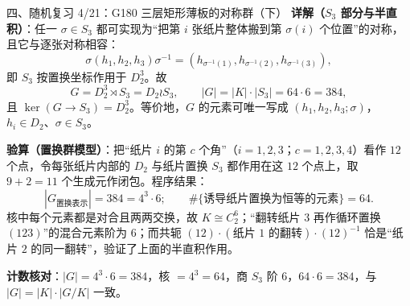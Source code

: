\documentclass[aspectratio=169,10pt,fontset=none]{ctexbeamer}
\newcommand{\key}[1]{\textcolor{ink}{\bfseries #1}}
\begin{document}
\begin{frame}[t]{四、随机复习 4/21：G180 三层矩形薄板的对称群（下）}
\scriptsize
\key{详解（$S_3$ 部分与半直积）}：任一 $\sigma\in S_3$ 都可实现为“把第 $i$ 张纸片整体搬到第 $\sigma(i)$ 个位置”的对称，且它与逐张对称相容：
\[ \sigma(h_1,h_2,h_3)\sigma^{-1}=(h_{\sigma^{-1}(1)},h_{\sigma^{-1}(2)},h_{\sigma^{-1}(3)}), \]
即 $S_3$ 按置换坐标作用于 $D_2^3$。故
\[ G=D_2^3\rtimes S_3=D_2\wr S_3,\qquad |G|=|K|\cdot|S_3|=64\cdot6=384, \]
且 $\ker(G\to S_3)=D_2^3$。等价地，$G$ 的元素可唯一写成 $(h_1,h_2,h_3;\sigma)$，$h_i\in D_2$、$\sigma\in S_3$。

\key{验算（置换群模型）}：把“纸片 $i$ 的第 $c$ 个角”（$i=1,2,3$；$c=1,2,3,4$）看作 $12$ 个点，令每张纸片内部的 $D_2$ 与纸片置换 $S_3$ 都作用在这 $12$ 个点上，取 $9+2=11$ 个生成元作闭包。程序结果：
\[ |G_{\text{置换表示}}|=384=4^3\cdot6;\qquad \#\{\text{诱导纸片置换为恒等的元素}\}=64. \]
核中每个元素都是对合且两两交换，故 $K\cong C_2^6$；“翻转纸片 $3$ 再作循环置换 $(123)$”的混合元素阶为 $6$；而共轭 $(12)\cdot(\text{纸片 }1\text{ 的翻转})\cdot(12)^{-1}$ 恰是“纸片 $2$ 的同一翻转”，验证了上面的半直积作用。

\key{计数核对}：$|G|=4^3\cdot6=384$，核 $=4^3=64$，商 $S_3$ 阶 $6$，$64\cdot6=384$，与 $|G|=|K|\cdot|G/K|$ 一致。
\end{frame}
\end{document}
